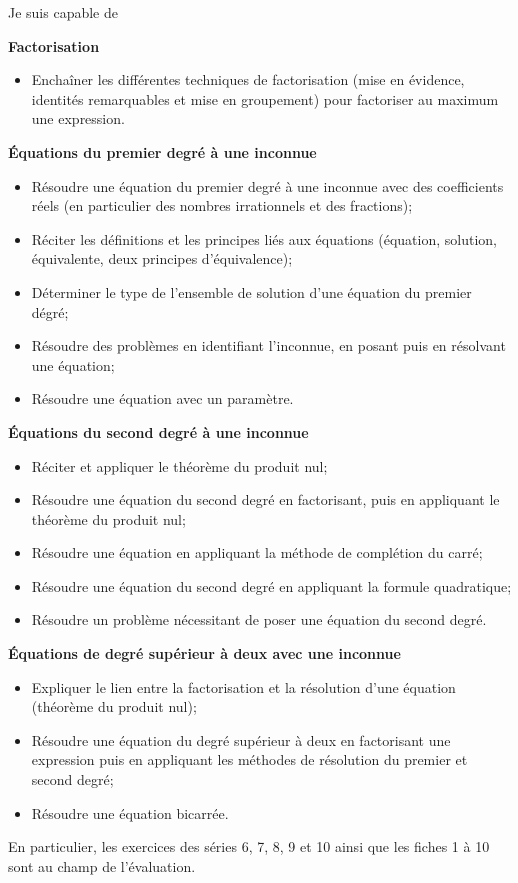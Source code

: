 \documentclass[a4paper,12pt]{report}
\begin{document}
Je suis capable de

{\bfseries Factorisation}
\begin{itemize}
	\item Enchaîner les différentes techniques de factorisation (mise en évidence, identités remarquables et mise en groupement) pour factoriser au maximum une expression.
\end{itemize}
{\bfseries Équations du premier degré à une inconnue}
\begin{itemize}
	\item Résoudre une équation du premier degré à une inconnue avec des coefficients réels (en particulier des nombres irrationnels et des fractions);
	\item Réciter les définitions et les principes liés aux équations (équation, solution, équivalente, deux principes d'équivalence);
	\item Déterminer le type de l'ensemble de solution d'une équation du premier dégré;
	\item Résoudre des problèmes en identifiant l'inconnue, en posant puis en résolvant une équation;
	\item Résoudre une équation avec un paramètre.
\end{itemize}
{\bfseries Équations du second degré à une inconnue}
\begin{itemize}
	\item Réciter et appliquer le théorème du produit nul;
	\item Résoudre une équation du second degré en factorisant, puis en appliquant le théorème du produit nul;
	\item Résoudre une équation en appliquant la méthode de complétion du carré;
	 \item Résoudre une équation du second degré en appliquant la formule quadratique;
	\item Résoudre un problème nécessitant de poser une équation du second degré.
\end{itemize}
{\bfseries Équations de degré supérieur à deux avec une inconnue}
\begin{itemize}
	\item Expliquer le lien entre la factorisation et la résolution d'une équation (théorème du produit nul);
	\item Résoudre une équation du degré supérieur à deux en factorisant une expression puis en appliquant les méthodes de résolution du premier et second degré; 
	\item Résoudre une équation bicarrée. 
\end{itemize}

En particulier, les exercices des séries 6, 7, 8, 9 et 10 ainsi que les fiches 1 à 10 sont au champ de l'évaluation.
\end{document}
